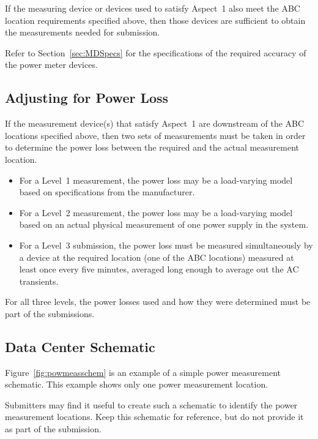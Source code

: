 If the measuring device or devices used to satisfy Aspect~1 also meet the ABC location requirements specified above, then those devices are sufficient to obtain the measurements needed for submission.

Refer to Section~\ref{sec:MDSpecs} for the specifications of the required accuracy of the power meter devices.

\subsection{Adjusting for Power Loss}
\label{sec:AfPL}

If the measurement device(s) that satisfy Aspect~1 are downstream of the ABC locations specified above, then two sets of measurements must be taken in order to determine the power loss between the required and the actual measurement location.

\begin{itemize}
\item
For a Level~1 measurement, the power loss may be a load-varying model based on specifications from the manufacturer.
\item
For a Level~2 measurement, the power loss may be a load-varying model based on an actual physical measurement of one power supply in the system.
\item
For a Level~3 submission, the power loss must be measured simultaneously by a device at the required location (one of the ABC locations) measured at least once every five minutes, averaged long enough to average out the AC transients.
\end{itemize}

For all three levels, the power losses used and how they were determined must be part of the submissions.

\subsection{Data Center Schematic}

Figure~\ref{fig:powmeasschem} is an example of a simple power measurement schematic.
This example shows only one power measurement location.

Submitters may find it useful to create such a schematic to identify the power measurement locations.
Keep this schematic for reference, but do not provide it as part of the submission.

